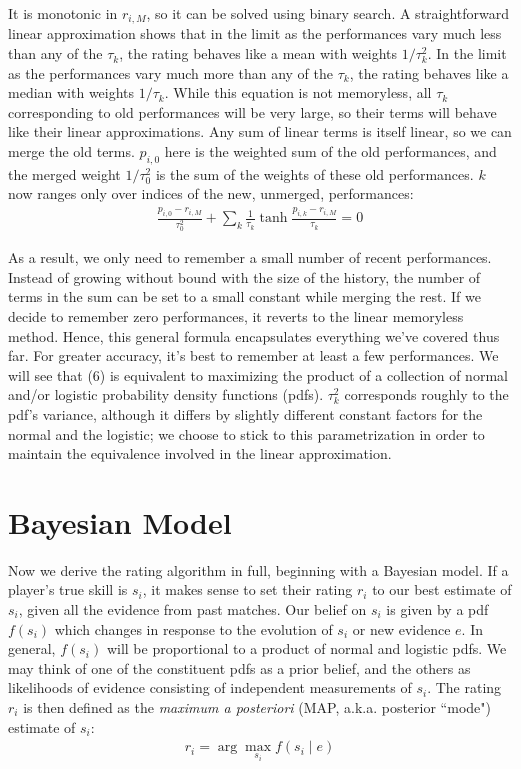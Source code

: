 \documentclass{article}
\begin{document}
It is monotonic in $r_{i,M}$, so it can be solved using binary search. A straightforward linear approximation shows that in the limit as the performances vary much less than any of the $\tau_k$, the rating behaves like a mean with weights $1/\tau_k^2$. In the limit as the performances vary much more than any of the $\tau_k$, the rating behaves like a median with weights $1/\tau_k$. While this equation is not memoryless, all $\tau_k$ corresponding to old performances will be very large, so their terms will behave like their linear approximations. Any sum of linear terms is itself linear, so we can merge the old terms. $p_{i,0}$ here is the weighted sum of the old performances, and the merged weight $1/\tau_0^2$ is the sum of the weights of these old performances. $k$ now ranges only over indices of the new, unmerged, performances:
\begin{align}
\frac{p_{i,0} - r_{i,M}}{\tau_0^2} + \sum_k \frac {1}{\tau_k} \tanh\frac{p_{i,k} - r_{i,M}}{\tau_k} = 0
\end{align}

As a result, we only need to remember a small number of recent performances. Instead of growing without bound with the size of the history, the number of terms in the sum can be set to a small constant while merging the rest. If we decide to remember zero performances, it reverts to the linear memoryless method. Hence, this general formula encapsulates everything we've covered thus far. For greater accuracy, it's best to remember at least a few performances. We will see that (6) is equivalent to maximizing the product of a collection of normal and/or logistic probability density functions (pdfs). $\tau_k^2$ corresponds roughly to the pdf's variance, although it differs by slightly different constant factors for the normal and the logistic; we choose to stick to this parametrization in order to maintain the equivalence involved in the linear approximation.

\section{Bayesian Model}

Now we derive the rating algorithm in full, beginning with a Bayesian model. If a player's true skill is $s_i$, it makes sense to set their rating $r_i$ to our best estimate of $s_i$, given all the evidence from past matches. Our belief on $s_i$ is given by a pdf $f(s_i)$ which changes in response to the evolution of $s_i$ or new evidence $e$. In general, $f(s_i)$ will be proportional to a product of normal and logistic pdfs. We may think of one of the constituent pdfs as a prior belief, and the others as likelihoods of evidence consisting of independent measurements of $s_i$. The rating $r_i$ is then defined as the \emph{maximum a posteriori} (MAP, a.k.a. posterior ``mode") estimate of $s_i$:
\begin{align}
r_i = \arg\max_{s_i} f(s_i\mid e)
\end{align}
\end{document}

